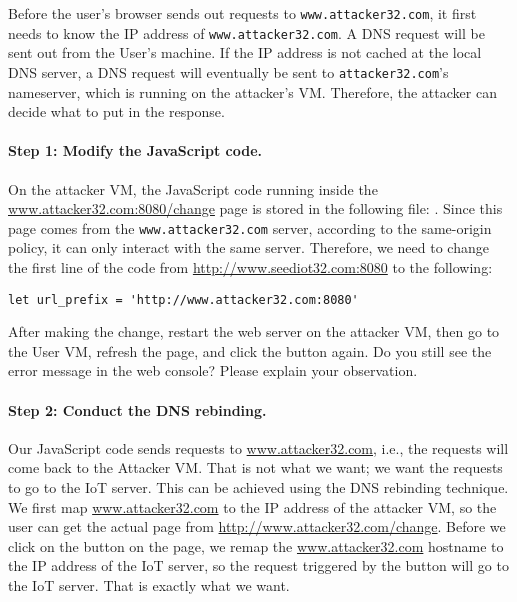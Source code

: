 Before the user's browser sends out requests to \texttt{www.attacker32.com},
it first needs to know the IP address of \texttt{www.attacker32.com}. 
A DNS request will be sent out from the User's machine. If the 
IP address is not cached at the local DNS server, a DNS request will
eventually be sent to \texttt{attacker32.com}'s  nameserver, which 
is running on the attacker's VM. 
Therefore, the attacker can decide what to put in the response. 


\paragraph{Step 1: Modify the JavaScript code.}
On the attacker VM, the JavaScript code running inside the 
\url{www.attacker32.com:8080/change} page is 
stored in the following file: 
. Since this page
comes from the \texttt{www.attacker32.com} server, 
according to the same-origin policy, it can only
interact with the same server. Therefore, we need to change the first 
line of the code from \url{http://www.seediot32.com:8080} 
to the following:

\begin{lstlisting}
let url_prefix = 'http://www.attacker32.com:8080'
\end{lstlisting}
 

After making the change, restart the web server on the attacker VM, then
go to the User VM, refresh the page, and click the button again. Do you still see the error
message in the web console? Please explain your observation. 



\paragraph{Step 2: Conduct the DNS rebinding.}
Our JavaScript code sends requests to \url{www.attacker32.com}, 
i.e., the requests will come back to the Attacker VM. That is not 
what we want; we want the requests to go to the IoT server. 
This can be achieved using the DNS rebinding 
technique. We first map \url{www.attacker32.com} to the IP address of the attacker VM, so
the user can get the actual page from \url{http://www.attacker32.com/change}. 
Before we click on the button on the page, we remap
the \url{www.attacker32.com} hostname to the IP address of the IoT server, so
the request triggered by the button will go to the IoT server. That is exactly what 
we want. 


